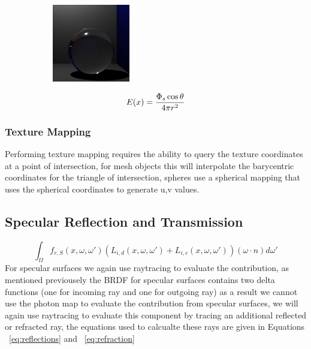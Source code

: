 \begin{figure}
	\centering
	\begin{subfigure}[c]{0.4\textwidth}
	\includegraphics{./images/renders/refraction/render-schlick.png}
	\end{subfigure}
	\begin{subfigure}[b]{0.4\textwidth}
	\begin{equation}
	\centering
		E(x) = \frac
		{
			\Phi_s \cos{\theta}
		}
		{
			4 \pi r^2
		}
	\end{equation}
	\end{subfigure}
\end{figure}

\subsubsection{Texture Mapping}
Performing texture mapping requires the ability to query the texture coordinates at a point of intersection, for mesh objects this
will interpolate the barycentric coordinates for the triangle of intersection, spheres use a spherical mapping that uses the
spherical coordinates to generate u,v values.

\subsection{Specular Reflection and Transmission}
\begin{equation*}
	\int_{\Omega}
	f_{r,S}(x, \omega, \omega')
	(
		L_{i,d}(x,\omega,\omega')
		+
		L_{i,c}(x,\omega,\omega')
	)
	(\omega \cdot n)d\omega'
\end{equation*}
For specular surfaces we again use raytracing to evaluate the contribution, as mentioned previousely the BRDF for specular surfaces
contains two delta functions (one for incoming ray and one for outgoing ray) as a result we cannot use the photon map to evaluate
the contribution from specular surfaces, we will again use raytracing to evaluate this component by tracing an additional reflected
or refracted ray, the equations used to calcualte these rays are given in Equations ~\ref{eq:reflections} and ~\ref{eq:refraction}


